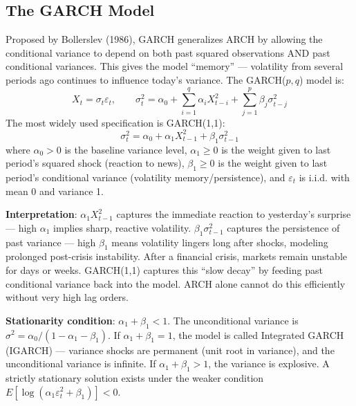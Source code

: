 \documentclass[11pt,a4paper]{article}
\begin{document}
\subsection{The GARCH Model}

Proposed by Bollerslev (1986), GARCH generalizes ARCH by allowing the conditional variance to depend on both past squared observations AND past conditional variances. This gives the model ``memory'' --- volatility from several periods ago continues to influence today's variance. The GARCH($p,q$) model is:
\[
X_t = \sigma_t \varepsilon_t, \qquad \sigma_t^2 = \alpha_0 + \sum_{i=1}^q \alpha_i X_{t-i}^2 + \sum_{j=1}^p \beta_j \sigma_{t-j}^2
\]
The most widely used specification is GARCH(1,1):
\[
\sigma_t^2 = \alpha_0 + \alpha_1 X_{t-1}^2 + \beta_1 \sigma_{t-1}^2
\]
where $\alpha_0 > 0$ is the baseline variance level, $\alpha_1 \geq 0$ is the weight given to last period's squared shock (reaction to news), $\beta_1 \geq 0$ is the weight given to last period's conditional variance (volatility memory/persistence), and $\varepsilon_t$ is i.i.d. with mean 0 and variance 1.

\textbf{Interpretation}: $\alpha_1 X_{t-1}^2$ captures the immediate reaction to yesterday's surprise --- high $\alpha_1$ implies sharp, reactive volatility. $\beta_1 \sigma_{t-1}^2$ captures the persistence of past variance --- high $\beta_1$ means volatility lingers long after shocks, modeling prolonged post-crisis instability. After a financial crisis, markets remain unstable for days or weeks. GARCH(1,1) captures this ``slow decay'' by feeding past conditional variance back into the model. ARCH alone cannot do this efficiently without very high lag orders.

\textbf{Stationarity condition}: $\alpha_1 + \beta_1 < 1$. The unconditional variance is $\sigma^2 = \alpha_0 / (1 - \alpha_1 - \beta_1)$. If $\alpha_1 + \beta_1 = 1$, the model is called Integrated GARCH (IGARCH) --- variance shocks are permanent (unit root in variance), and the unconditional variance is infinite. If $\alpha_1 + \beta_1 > 1$, the variance is explosive. A strictly stationary solution exists under the weaker condition $E[\log(\alpha_1 \varepsilon_t^2 + \beta_1)] < 0$.
\end{document}
